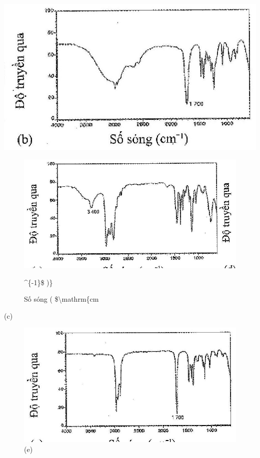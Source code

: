 \documentclass[10pt]{article}
\begin{document}
\begin{center}
\includegraphics[max width=\textwidth]{2025_10_23_fa9073eecee116ad8cf2g-38(5)}
\end{center}

\begin{figure}[h]
\begin{center}
  \includegraphics[width=\textwidth]{2025_10_23_fa9073eecee116ad8cf2g-38(2)}
\captionsetup{labelformat=empty}
\caption{Số sóng ( \$\textbackslash mathrm\{cm}\^{}\{-1\}\$ )\}\end{center}
\end{figure}

(c)

\begin{figure}[h]
\begin{center}
  \includegraphics[width=\textwidth]{2025_10_23_fa9073eecee116ad8cf2g-38(4)}
\captionsetup{labelformat=empty}
\caption{(e)}
\end{center}
\end{figure}
\end{document}
